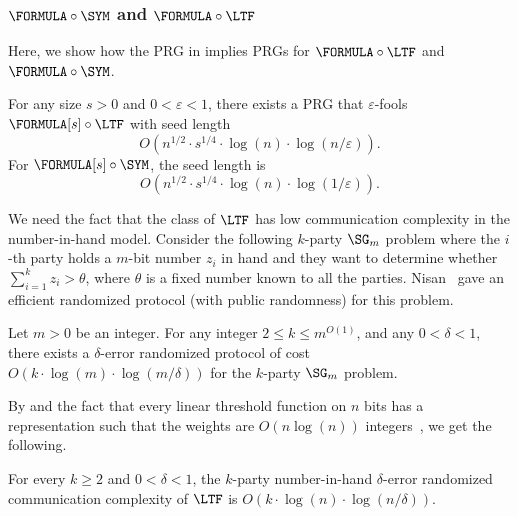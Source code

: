     \subsubsection{\texorpdfstring{$\FORMULA\circ\SYM$}{FORMULA-SYM} and \texorpdfstring{$\FORMULA\circ\LTF$}{FORMULA-LTF}}
	
	Here, we show how the PRG in  implies PRGs for $\FORMULA\circ\LTF$ and $\FORMULA\circ\SYM$.
	
	\begin{theorem}\label{thm:prg-formula-sym}
		For any size $s>0$ and $0<\varepsilon<1$, there exists a PRG that $\varepsilon$-fools $\FORMULA[s]\circ \LTF$ with seed length
        \[
			O\left(n^{1/2}\cdot s^{1/4}\cdot \log(n)\cdot \log(n/\varepsilon)\right).
		\]
		For $\FORMULA[s]\circ \SYM$, the seed length is
		\[
		    O\left(n^{1/2}\cdot s^{1/4}\cdot \log(n)\cdot \log(1/\varepsilon) \right).
		\]
	\end{theorem}
	
	We need the fact that the class of $\LTF$ has low communication complexity in the number-in-hand model. Consider the following $k$-party $\SG_m$ problem where the $i$-th party holds a $m$-bit number $z_i$ in hand and they want to determine whether $\sum_{i=1}^k z_i > \theta$, where $\theta$ is a fixed number known to all the parties. Nisan~\cite{Nis94} gave an efficient randomized protocol (with public randomness) for this problem.
    
%
%
%
    
    \begin{theorem}[\cite{Nis94}\footnote{Viola~\cite{Vio15} gave a $\delta$-error randomized protocol for the $k$-party $\SG_m$ problem of cost $O(k\cdot\log(k)\cdot\log(m/\delta))$, which is better than Nisan's protocol when $k=m^{o(1)}$.}]\label{thm:prg-k-party-sum}
	    Let $m>0$ be an integer. For any integer $2\leq k\leq m^{O(1)}$, and any $0<\delta<1$, there exists a $\delta$-error randomized protocol of cost $O(k\cdot\log(m)\cdot\log(m/\delta))$ for the $k$-party $\SG_m$ problem.
	\end{theorem}
	    
    By  and the fact that every linear threshold function on $n$ bits has a representation such that the weights are $O(n\log(n))$ integers~\cite{MTT61}, we get the following.
    
    \begin{corollary}\label{cor:prg-k-party-LTF}
         For every $k\geq 2$ and $0<\delta<1$, the $k$-party number-in-hand $\delta$-error randomized communication complexity of $\LTF$ is $O(k\cdot\log(n)\cdot\log(n/\delta))$.
    \end{corollary}
    
